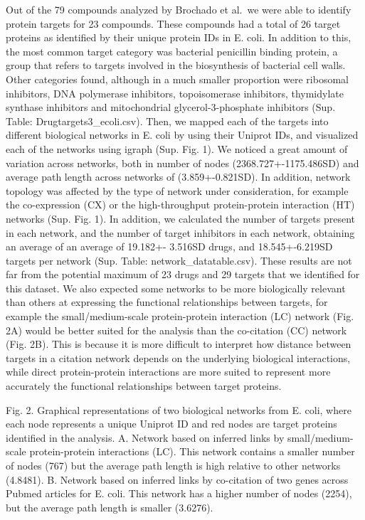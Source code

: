 \documentclass[]{elsarticle} %
\begin{document}
Out of the 79 compounds analyzed by Brochado et al.~we were able to identify protein targets for 23 compounds. These compounds had a total of 26 target proteins as identified by their unique protein IDs in E. coli. In addition to this, the most common target category was bacterial penicillin binding protein, a group that refers to targets involved in the biosynthesis of bacterial cell walls. Other categories found, although in a much smaller proportion were ribosomal inhibitors, DNA polymerase inhibitors, topoisomerase inhibitors, thymidylate synthase inhibitors and mitochondrial glycerol-3-phosphate inhibitors (Sup. Table: Drugtargets3\_ecoli.csv). Then, we mapped each of the targets into different biological networks in E. coli by using their Uniprot IDs, and visualized each of the networks using igraph (Sup. Fig. 1). We noticed a great amount of variation across networks, both in number of nodes (2368.727+-1175.486SD) and average path length across networks of (3.859+-0.821SD). In addition, network topology was affected by the type of network under consideration, for example the co-expression (CX) or the high-throughput protein-protein interaction (HT) networks (Sup. Fig. 1). In addition, we calculated the number of targets present in each network, and the number of target inhibitors in each network, obtaining an average of an average of 19.182+- 3.516SD drugs, and 18.545+-6.219SD targets per network (Sup. Table: network\_datatable.csv). These results are not far from the potential maximum of 23 drugs and 29 targets that we identified for this dataset. We also expected some networks to be more biologically relevant than others at expressing the functional relationships between targets, for example the small/medium-scale protein-protein interaction (LC) network (Fig. 2A) would be better suited for the analysis than the co-citation (CC) network (Fig. 2B). This is because it is more difficult to interpret how distance between targets in a citation network depends on the underlying biological interactions, while direct protein-protein interactions are more suited to represent more accurately the functional relationships between target proteins.

Fig. 2. Graphical representations of two biological networks from E. coli, where each node represents a unique Uniprot ID and red nodes are target proteins identified in the analysis. A. Network based on inferred links by small/medium-scale protein-protein interactions (LC). This network contains a smaller number of nodes (767) but the average path length is high relative to other networks (4.8481). B. Network based on inferred links by co-citation of two genes across Pubmed articles for E. coli. This network has a higher number of nodes (2254), but the average path length is smaller (3.6276).
\end{document}
